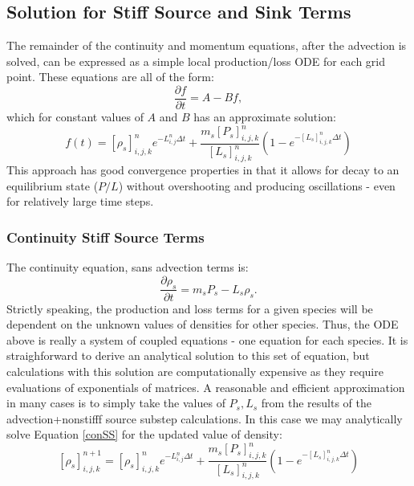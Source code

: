 \documentclass[11pt,letterpaper]{article}
\begin{document}
\subsection{Solution for Stiff Source and Sink Terms} \label{sec:numstiffsource}

The remainder of the continuity and momentum equations, after the advection is solved, can be expressed as a simple local production/loss ODE for each grid point.  These equations are all of the form:
\begin{equation}
\frac{\partial f}{\partial t} = A - B f, 
\end{equation}
which for constant values of $A$ and $B$ has an approximate solution:
\begin{equation}
f(t) = \left[ \rho_s \right]_{i,j,k}^n e^{-L_{i,j}^n \Delta t} + \frac{m_s \left[ P_s \right]_{i,j,k}^n}{\left[ L_s \right]_{i,j,k}^n} \left( 1 - e^{-\left[ L_s \right]_{i,j,k}^n \Delta t} \right) \label{conSSsoln}
\end{equation}
This approach has good convergence properties in that it allows for decay to an equilibrium state ($P/L$) without overshooting and producing oscillations - even for relatively large time steps.  %

\subsubsection{Continuity Stiff Source Terms}

The continuity equation, sans advection terms is:
\begin{equation}
\frac{\partial \rho_s }{\partial t} = m_s P_s - L_s \rho_s. \label{conSS}
\end{equation}
Strictly speaking, the production and loss terms for a given species will be dependent on the unknown values of densities for other species.  Thus, the ODE above is really a system of coupled equations - one equation for each species.  It is straighforward to derive an analytical solution to this set of equation, but calculations with this solution are computationally expensive as they require evaluations of exponentials of matrices.  A reasonable and efficient approximation in many cases is to simply take the values of $P_s,L_s$ from the results of the advection+nonstifff source substep calculations.  In this case we may analytically solve Equation \ref{conSS} for the updated value of density:  
\begin{equation}
\left[ \rho_s \right]_{i,j,k}^{n+1} = \left[ \rho_s \right]_{i,j,k}^n e^{-L_{i,j}^n \Delta t} + \frac{m_s \left[ P_s \right]_{i,j,k}^n}{\left[ L_s \right]_{i,j,k}^n} \left( 1 - e^{-\left[ L_s \right]_{i,j,k}^n \Delta t} \right) \label{conSSsoln}
\end{equation}
\end{document}
